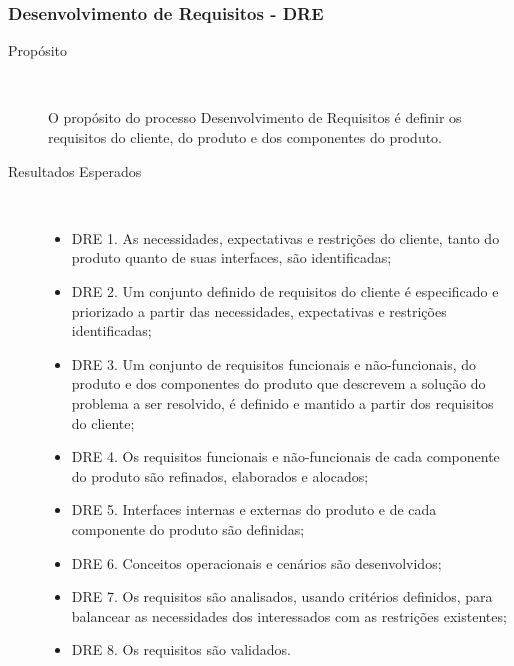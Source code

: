     \subsubsection{Desenvolvimento de Requisitos - DRE}
    \begin{description}
      \item [Propósito] \

       O propósito do processo Desenvolvimento de Requisitos é definir os requisitos
       do cliente, do produto e dos componentes do produto.

      \item [Resultados Esperados]\

      \begin{itemize}
        \item DRE 1. As necessidades, expectativas e restrições do cliente, tanto do produto
              quanto de suas interfaces, são identificadas;
        \item DRE 2. Um conjunto definido de requisitos do cliente é especificado e priorizado
              a partir das necessidades, expectativas e restrições identificadas;
        \item DRE 3. Um conjunto de requisitos funcionais e não-funcionais, do produto e dos componentes
                    do produto que descrevem a solução do problema a ser resolvido, é definido e mantido
                    a partir dos requisitos do cliente;
        \item DRE 4. Os requisitos funcionais e não-funcionais de cada componente do produto são
              refinados, elaborados e alocados;
        \item DRE 5. Interfaces internas e externas do produto e de cada componente do produto são
              definidas;
        \item DRE 6. Conceitos operacionais e cenários são desenvolvidos;
        \item DRE 7. Os requisitos são analisados, usando critérios definidos, para balancear
              as necessidades dos interessados com as restrições existentes;
        \item DRE 8. Os requisitos são validados.
      \end{itemize}
    \end{description}
